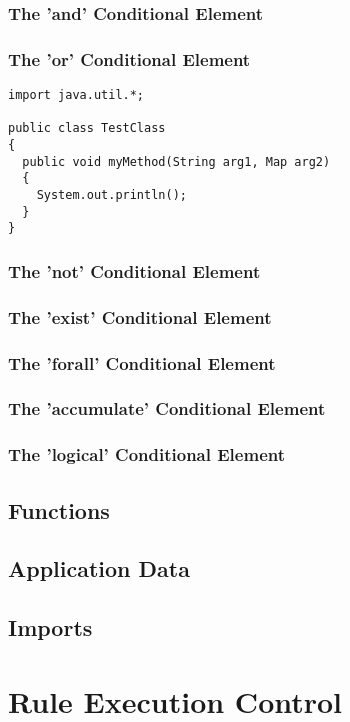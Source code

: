\subsubsection{The 'and' Conditional Element}
\subsubsection{The 'or' Conditional Element}

\lstset{language=Java}
\begin{lstlisting}
import java.util.*;

public class TestClass
{
  public void myMethod(String arg1, Map arg2)
  {
    System.out.println();
  }
}
\end{lstlisting}

\subsubsection{The 'not' Conditional Element}
\subsubsection{The 'exist' Conditional Element}
\subsubsection{The 'forall' Conditional Element}
\subsubsection{The 'accumulate' Conditional Element}
\subsubsection{The 'logical' Conditional Element}

\subsection{Functions}

\subsection{Application Data}

\subsection{Imports}

\section{Rule Execution Control}
